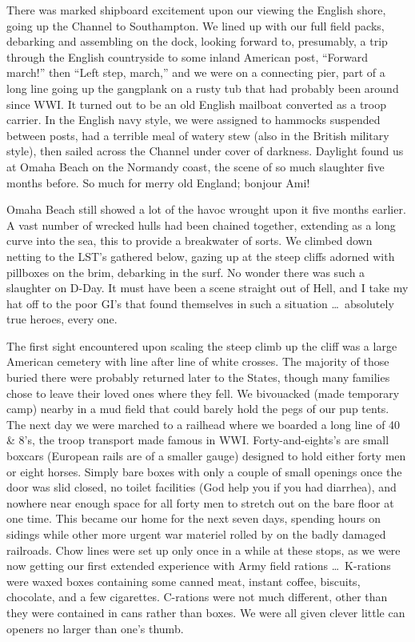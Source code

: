 \documentclass[../m3y]{subfiles}
\begin{document}
There was marked shipboard excitement upon our viewing the English shore, going up the Channel to Southampton. We lined up with our full field packs, debarking and assembling on the dock, looking forward to, presumably, a trip through the English countryside to some inland American post, ``Forward march!'' then ``Left step, march,'' and we were on a connecting pier, part of a long line going up the gangplank on a rusty tub that had probably been around since WW\thinspace{}I. It turned out to be an old English mailboat converted as a troop carrier. In the English navy style, we were assigned to hammocks suspended between posts, had a terrible meal of watery stew (also in the British military style), then sailed across the Channel under cover of darkness. Daylight found us at Omaha Beach on the Normandy coast, the scene of so much slaughter five months before. So much for merry old England; bonjour Ami!

Omaha Beach still showed a lot of the havoc wrought upon it five months earlier. A vast number of wrecked hulls had been chained together, extending as a long curve into the sea, this to provide a breakwater of sorts. We climbed down netting to the LST's gathered below, gazing up at the steep cliffs adorned with pillboxes on the brim, debarking in the surf. No wonder there was such a slaughter on D-Day. It must have been a scene straight out of Hell, and I take my hat off to the poor GI's that found themselves in such a situation \ldots\ absolutely true heroes, every one.

The first sight encountered upon scaling the steep climb up the cliff was a large American cemetery with line after line of white crosses. The majority of those buried there were probably returned later to the States, though many families chose to leave their loved ones where they fell. We bivouacked (made temporary camp) nearby in a mud field that could barely hold the pegs of our pup tents. The next day we were marched to a railhead where we boarded a long line of 40 \& 8's, the troop transport made famous in WW\thinspace{}I. Forty-and-eights's are small boxcars (European rails are of a smaller gauge) designed to hold either forty men or eight horses. Simply bare boxes with only a couple of small openings once the door was slid closed, no toilet facilities (God help you if you had diarrhea), and nowhere near enough space for all forty men to stretch out on the bare floor at one time. This became our home for the next seven days, spending hours on sidings while other more urgent war materiel rolled by on the badly damaged railroads. Chow lines were set up only once in a while at these stops, as we were now getting our first extended experience with Army field rations \ldots\ K-rations were waxed boxes containing some canned meat, instant coffee, biscuits, chocolate, and a few cigarettes. C-rations were not much different, other than they were contained in cans rather than boxes. We were all given clever little can openers no larger than one's thumb.
\end{document}
